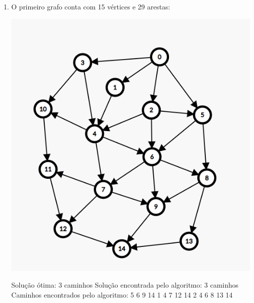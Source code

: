 \begin{enumerate}

    \item O primeiro grafo conta com 15 vértices e 29 arestas:
    \begin{center}
        \includegraphics[scale=0.35]{figuras/Grafo1.png}
    \end{center}
    Solução ótima: 3 caminhos\newline
    Solução encontrada pelo algoritmo: 3 caminhos\newline
    Caminhos encontrados pelo algoritmo: 5 6 9 14  1 4 7 12 14  2 4 6 8 13 14 \newline


\end{enumerate}
